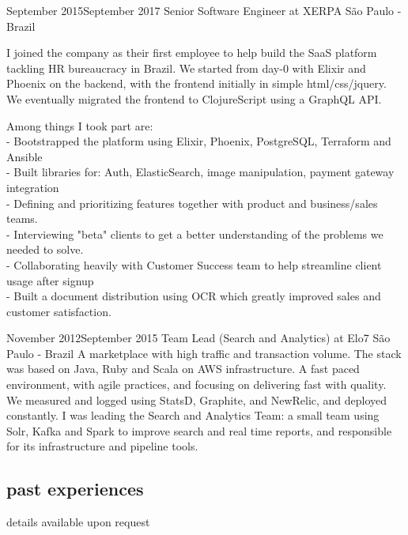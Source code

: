 \documentclass{nirev-cv}
\begin{document}
\workentry
    {September 2015}{September 2017}
    {Senior Software Engineer at XERPA}
    {São Paulo - Brazil}
    {I joined the company as their first employee to help build the SaaS platform tackling HR bureaucracy in Brazil.
    We started from day-0 with Elixir and Phoenix on the backend, with the frontend initially in simple html/css/jquery. We eventually migrated the frontend to ClojureScript using a GraphQL API.
    
    Among things I took part are: \\ \small
    - Bootstrapped the platform using Elixir, Phoenix, PostgreSQL, Terraform and Ansible \\
    - Built libraries for: Auth, ElasticSearch, image manipulation, payment gateway integration \\
    - Defining and prioritizing features together with product and business/sales teams. \\
    - Interviewing "beta" clients to get a better understanding of the problems we needed to solve. \\
    - Collaborating heavily with Customer Success team to help streamline client usage after signup \\%
    - Built a document distribution using OCR which greatly improved sales and customer satisfaction. %
    }

\workentry
  {November 2012}{September 2015}
  {Team Lead (Search and Analytics) at Elo7}
  {São Paulo - Brazil}
  {A marketplace with high traffic and transaction volume. The stack was based on Java, Ruby and Scala on AWS infrastructure. A fast paced environment, with agile practices, and focusing on delivering fast with quality. We measured and logged using StatsD, Graphite, and NewRelic, and deployed constantly. I was leading the Search and Analytics Team: a small team using Solr, Kafka and Spark to improve search and real time reports, and responsible for its infrastructure and pipeline tools.}


\subsection{past experiences}
details available upon request
\end{document}

